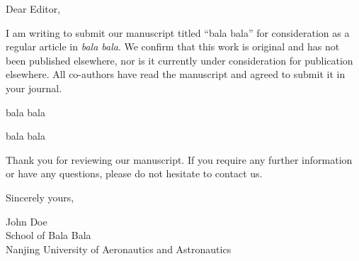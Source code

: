 \documentclass{article}
\begin{document}
\bigskip %

Dear Editor,

\bigskip %


I am writing to submit our manuscript titled ``bala bala'' for consideration as a regular article in \textit{bala bala}. We confirm that this work is original and has not been published elsewhere, nor is it currently under consideration for publication elsewhere. All co-authors have read the manuscript and agreed to submit it in your journal.

bala bala

\vspace{6\baselineskip}

bala bala

\vspace{6\baselineskip}

Thank you for reviewing our manuscript. If you require any further information or have any questions, please do not hesitate to contact us.

\bigskip %

Sincerely yours,

\vspace{20pt} %

John Doe \\
School of Bala Bala \\
Nanjing University of Aeronautics and Astronautics \\
\end{document}
